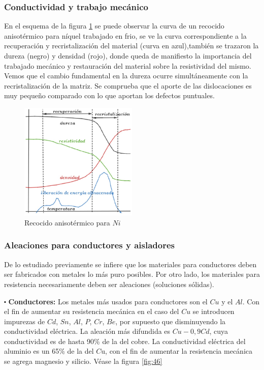 \subsubsection{Conductividad y trabajo mecánico}

En el esquema de la figura \ref{fig:44a} se puede observar la curva de un recocido anisotérmico para níquel trabajado en frio, se ve la curva correspondiente a la recuperación y recristalización del material (curva en azul),también se trazaron la dureza (negro) y densidad (rojo), donde queda de manifiesto la importancia del trabajado mecánico y restauración del material sobre la resistividad del mismo. Vemos que el cambio fundamental en la dureza ocurre simultáneamente con la recristalización de la matriz. Se comprueba que el aporte de las dislocaciones es muy pequeño comparado con lo que aportan los defectos puntuales.

\begin{figure}[H]
    \centering
    \includegraphics[width=0.5\textwidth]{./Figures/fig43}
	\caption{Recocido anisotérmico para $Ni$}
	\label{fig:44a}
\end{figure}


\subsubsection{Aleaciones para conductores y aisladores}

De lo estudiado previamente se infiere que los materiales para conductores deben ser fabricados con metales lo más puro posibles. Por otro lado, los materiales para resistencia necesariamente deben ser aleaciones (soluciones sólidas).

$\centerdot$ \textbf{Conductores:}
Los metales más usados para conductores son el $Cu$ y el $Al$. Con el fin de aumentar su resistencia mecánica en el caso del $Cu$ se introducen impurezas de $Cd$, $Sn$, $Al$, $P$, $Cr$, $Be$, por supuesto que disminuyendo la conductividad eléctrica. La aleación más difundida es $Cu-0,9Cd$, cuya conductividad es de hasta 90\% de la del cobre. La conductividad eléctrica del aluminio es un 65\% de la del $C$u, con el fin de aumentar la resistencia mecánica se agrega magnesio y silicio. Véase la figura \ref{fig:46}

